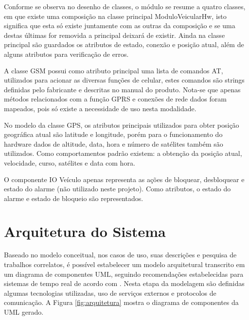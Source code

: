 Conforme se observa no desenho de classes, o módulo se resume a quatro classes, em que existe uma composição na classe principal ModuloVeicularHw, isto significa que esta só existe juntamente com as outras da composição e se uma destas últimas for removida a principal deixará de existir. Ainda na classe principal são guardados os atributos de estado, conexão e posição atual, além de alguns atributos para verificação de erros.

A classe GSM possui como atributo principal uma lista de comandos AT, utilizados para acionar as diversas funções de celular, estes comandos são strings definidas pelo fabricante e descritas no manual do produto. Nota-se que apenas métodos relacionados com a função GPRS e conexões de rede dados foram mapeados, pois só existe a necessidade de uso nesta modalidade.

No modelo da classe GPS, os atributos principais utilizados para obter posição geográfica atual são latitude e longitude, porém para o funcionamento do hardware
dados de altitude, data, hora e número de satélites também são utilizados. Como comportamentos padrão existem: a obtenção da posição atual, velocidade, curso, satélites e data com hora.

O componente IO Veículo apenas representa as ações de bloquear, desbloquear e estado do alarme (não utilizado neste projeto). Como atributos, o estado do alarme e estado de bloqueio são representados.

\section{Arquitetura do Sistema}

Baseado no modelo conceitual, nos casos de uso, suas descrições e pesquisa de trabalhos correlatos,
é possível estabelecer um modelo arquitetural transcrito em um diagrama de componentes UML, 
seguindo recomendações estabelecidas para sistemas de tempo real de acordo com \textcite{Mendes:2002}.
Nesta etapa da modelagem são definidas algumas tecnologias utilizadas, uso de serviços externos e protocolos
de comunicação. A Figura \ref{fig:arquitetura} mostra o diagrama de componentes da UML gerado.

